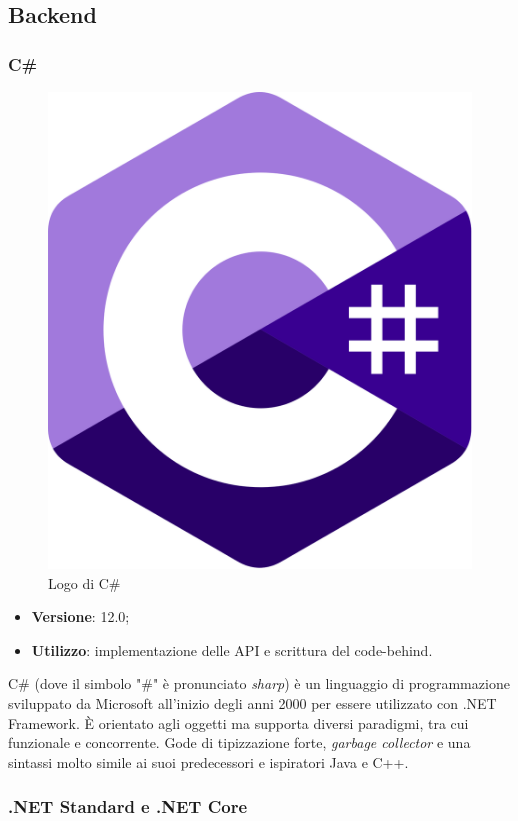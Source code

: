 



\subsection{Backend}

\subsubsection{C\#}

\begin{figure}[H]
    \centering 
    \includegraphics[width=0.15\columnwidth]{images/loghi/C_sharp-logo.png} 
    \caption{Logo di C\#}
\end{figure}

\begin{itemize}
    \item \textbf{Versione}: 12.0;
    \item \textbf{Utilizzo}: implementazione delle \gls{API} e scrittura del \gls{code-behind}.
\end{itemize}
C\# (dove il simbolo "\#" è pronunciato \emph{sharp}) è un linguaggio di programmazione sviluppato da Microsoft all'inizio degli anni 2000 per essere utilizzato con .NET Framework. È orientato agli oggetti ma supporta diversi paradigmi, tra cui funzionale e concorrente. Gode di tipizzazione forte, \emph{garbage collector} e una sintassi molto simile ai suoi predecessori e ispiratori Java e C++.

\subsubsection{.NET Standard e .NET Core}

